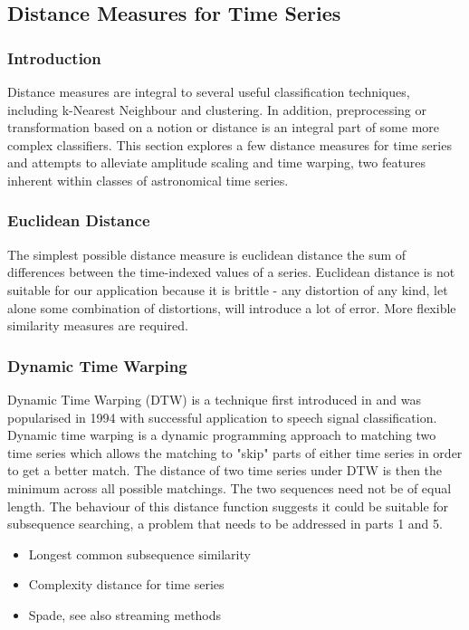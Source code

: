 \documentclass[11pt]{article}
\begin{document}
	\subsection{Distance Measures for Time Series}
	\subsubsection{Introduction}
	Distance measures are integral to several useful classification techniques, including k-Nearest Neighbour and clustering. In addition, preprocessing or transformation based on a notion or distance is an integral part of some more complex classifiers. This section explores a few distance measures for time series and attempts to alleviate amplitude scaling and time warping, two features inherent within classes of astronomical time series.
	\subsubsection{Euclidean Distance}
	The simplest possible distance measure is euclidean distance the sum of differences between the time-indexed values of a series. Euclidean distance is not suitable for our application because it is brittle - any distortion of any kind, let alone some combination of distortions, will introduce a lot of error. More flexible similarity measures are required.
	\subsubsection{Dynamic Time Warping}
	Dynamic Time Warping (DTW) is a technique first introduced in \citep{sakoe1978dynamic} and was popularised in 1994 \citep{berndt1994using} with successful application to speech signal classification. Dynamic time warping is a dynamic programming approach to matching two time series which allows the matching to "skip" parts of either time series in order to get a better match. The distance of two time series under DTW is then the minimum across all possible matchings. The two sequences need not be of equal length. The behaviour of this distance function suggests it could be suitable for subsequence searching, a problem that needs to be addressed in parts 1 and 5.
	\begin{itemize}
		\item Longest common subsequence similarity
		\item Complexity distance for time series \citep{batista2011complexity}
		\item Spade, see also streaming methods
	\end{itemize}
\end{document}
